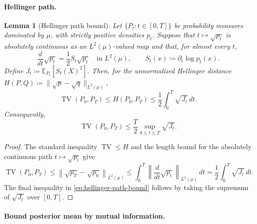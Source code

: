 \documentclass[11pt]{article}
\newtheorem{lemma}{Lemma}
\begin{document}
 







\paragraph{Hellinger path.}

\begin{lemma}[Hellinger path bound]
\label{lem:hellinger-path}
Let $\{P_t:t\in[0,T]\}$ be probability measures dominated by $\mu$, with
strictly positive densities $p_t$. Suppose that
$t\mapsto\sqrt{p_t}$ is absolutely continuous as an $L^2(\mu)$-valued map
and that, for almost every $t$,
\[
  \frac{d}{dt}\sqrt{p_t}
  =
  \frac12 S_t\sqrt{p_t}
  \quad\text{in }L^2(\mu),
  \qquad
  S_t(x)\coloneqq\partial_t\log p_t(x).
\]
Define
$J_t\coloneqq\mathbb E_{P_t}[S_t(X)^2]$. Then, for the unnormalized
Hellinger distance
$H(P,Q)\coloneqq\|\sqrt p-\sqrt q\|_{L^2(\mu)}$,
\begin{equation}
\label{eq:hellinger-path-bound}
  \operatorname{TV}(P_0,P_T)
  \le
  H(P_0,P_T)
  \le
  \frac12\int_0^T\sqrt{J_t}\,dt.
\end{equation}
Consequently,
\begin{equation}
\label{eq:hellinger-path-sup}
  \operatorname{TV}(P_0,P_T)
  \le
  \frac{T}{2}
  \sup_{0\le t\le T}\sqrt{J_t}.
\end{equation}
\end{lemma}

\begin{proof}
The standard inequality $\operatorname{TV}\le H$ and the length bound for
the absolutely continuous path $t\mapsto\sqrt{p_t}$ give
\[
  \operatorname{TV}(P_0,P_T)
  \le
  \left\|\sqrt{p_T}-\sqrt{p_0}\right\|_{L^2(\mu)}
  \le
  \int_0^T
  \left\|\frac{d}{dt}\sqrt{p_t}\right\|_{L^2(\mu)}\,dt
  =
  \frac12\int_0^T\sqrt{J_t}\,dt.
\]
The final inequality in \eqref{eq:hellinger-path-bound} follows by taking
the supremum of $\sqrt{J_t}$ over $[0,T]$.
\end{proof}


\paragraph{Bound posterior mean by mutual information.}
\end{document}
